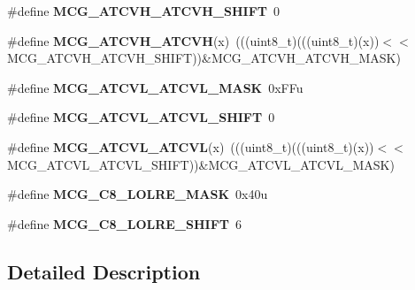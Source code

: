 \begin{DoxyCompactItemize}
\item 
\mbox{\label{group___m_c_g___register___masks_ga0fec2d450a98ab78dc7a2e4e9e33dbc6}} 
\#define {\bfseries M\+C\+G\+\_\+\+A\+T\+C\+V\+H\+\_\+\+A\+T\+C\+V\+H\+\_\+\+S\+H\+I\+FT}~0
\item 
\mbox{\label{group___m_c_g___register___masks_gab382a7e152cca964b5cd64708384c608}} 
\#define {\bfseries M\+C\+G\+\_\+\+A\+T\+C\+V\+H\+\_\+\+A\+T\+C\+VH}(x)~(((uint8\+\_\+t)(((uint8\+\_\+t)(x))$<$$<$M\+C\+G\+\_\+\+A\+T\+C\+V\+H\+\_\+\+A\+T\+C\+V\+H\+\_\+\+S\+H\+I\+FT))\&M\+C\+G\+\_\+\+A\+T\+C\+V\+H\+\_\+\+A\+T\+C\+V\+H\+\_\+\+M\+A\+SK)
\item 
\mbox{\label{group___m_c_g___register___masks_ga48750526150212b524f731e303a7e3cf}} 
\#define {\bfseries M\+C\+G\+\_\+\+A\+T\+C\+V\+L\+\_\+\+A\+T\+C\+V\+L\+\_\+\+M\+A\+SK}~0x\+F\+Fu
\item 
\mbox{\label{group___m_c_g___register___masks_ga9e3e0eab24aaf1bf2905ae0cf4803eb3}} 
\#define {\bfseries M\+C\+G\+\_\+\+A\+T\+C\+V\+L\+\_\+\+A\+T\+C\+V\+L\+\_\+\+S\+H\+I\+FT}~0
\item 
\mbox{\label{group___m_c_g___register___masks_ga124aa7c8cc26cfd1c06a278add1a0d21}} 
\#define {\bfseries M\+C\+G\+\_\+\+A\+T\+C\+V\+L\+\_\+\+A\+T\+C\+VL}(x)~(((uint8\+\_\+t)(((uint8\+\_\+t)(x))$<$$<$M\+C\+G\+\_\+\+A\+T\+C\+V\+L\+\_\+\+A\+T\+C\+V\+L\+\_\+\+S\+H\+I\+FT))\&M\+C\+G\+\_\+\+A\+T\+C\+V\+L\+\_\+\+A\+T\+C\+V\+L\+\_\+\+M\+A\+SK)
\item 
\mbox{\label{group___m_c_g___register___masks_gaeab391a933aec2eeb1ffdbc772f714e2}} 
\#define {\bfseries M\+C\+G\+\_\+\+C8\+\_\+\+L\+O\+L\+R\+E\+\_\+\+M\+A\+SK}~0x40u
\item 
\mbox{\label{group___m_c_g___register___masks_ga247e347342c951c4b8044bece01311fb}} 
\#define {\bfseries M\+C\+G\+\_\+\+C8\+\_\+\+L\+O\+L\+R\+E\+\_\+\+S\+H\+I\+FT}~6
\end{DoxyCompactItemize}


\subsection{Detailed Description}
